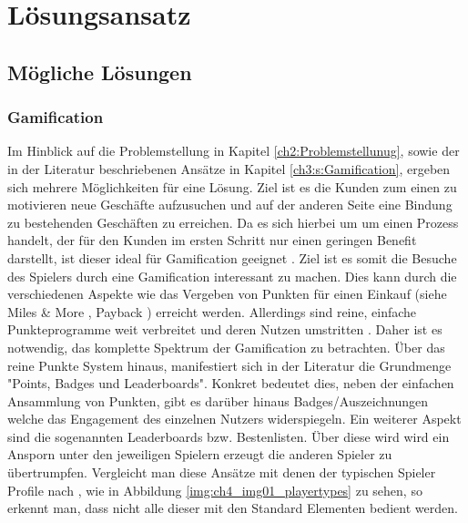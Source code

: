 \chapter{Lösungsansatz}
\label{ch:S4_Lösungsansatz}

\section{Mögliche Lösungen}
\label{ch4:s:Lösungen}

\subsection*{Gamification}


Im Hinblick auf die Problemstellung in Kapitel \ref{ch2:Problemstellunug}, sowie der in der Literatur beschriebenen Ansätze in Kapitel \ref{ch3:s:Gamification}, ergeben sich mehrere Möglichkeiten für eine Lösung. Ziel ist es die Kunden zum einen zu motivieren neue Geschäfte aufzusuchen und auf der anderen Seite eine Bindung zu bestehenden Geschäften zu erreichen. Da es sich hierbei um um einen Prozess handelt, der für den Kunden im ersten Schritt nur einen geringen Benefit darstellt, ist dieser ideal für Gamification geeignet \cite{Leigh.2012}. Ziel ist es somit die Besuche des Spielers durch eine Gamification interessant zu machen. Dies kann durch die verschiedenen Aspekte wie das Vergeben von Punkten für einen Einkauf (siehe Miles \& More \cite{Wagner.2005}, Payback \cite{Roesl.2005}) erreicht werden. Allerdings sind reine, einfache Punkteprogramme weit verbreitet und deren Nutzen umstritten \cite{Schmitt.2001}.
Daher ist es notwendig, das komplette Spektrum der Gamification zu betrachten.
Über das reine Punkte System hinaus, manifestiert sich in der Literatur die Grundmenge "Points, Badges und Leaderboards".
Konkret bedeutet dies, neben der einfachen Ansammlung von Punkten, gibt es darüber hinaus Badges/Auszeichnungen welche das Engagement des einzelnen Nutzers widerspiegeln. Ein weiterer Aspekt sind die sogenannten Leaderboards bzw. Bestenlisten. Über diese wird wird ein Ansporn unter den jeweiligen Spielern erzeugt die anderen Spieler zu übertrumpfen. Vergleicht man diese Ansätze mit denen der typischen Spieler Profile nach \citep{Bartle.2004}, wie in Abbildung \ref{img:ch4_img01_playertypes} zu sehen, so erkennt man, dass nicht alle dieser mit den Standard Elementen bedient werden.


